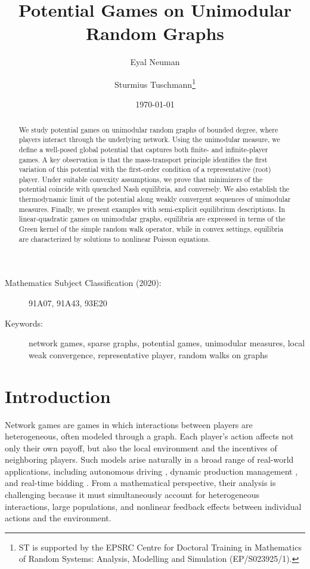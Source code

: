 \documentclass[11pt]{article}
\numberwithin{equation}{section}
\begin{document}
\title{Potential Games on Unimodular Random Graphs}
\author[]{Eyal Neuman}
\author[]{Sturmius Tuschmann\thanks{ST is supported by the EPSRC Centre for Doctoral Training in Mathematics of Random Systems: Analysis, Modelling and Simulation (EP/S023925/1).}}
\renewcommand\Authands{ and }
\date{\today}
\maketitle

\begin{abstract}
We study potential games on unimodular random graphs of bounded degree, where players interact through the underlying network. Using the unimodular measure, we define a well-posed global potential that captures both finite- and infinite-player games. A key observation is that the mass-transport principle identifies the first variation of this potential with the first-order condition of a representative (root) player. Under suitable convexity assumptions, we prove that minimizers of the potential coincide with quenched Nash equilibria, and conversely. We also establish the thermodynamic limit of the potential along weakly convergent sequences of unimodular measures. Finally, we present examples with semi-explicit equilibrium descriptions. In linear-quadratic games on unimodular graphs, equilibria are expressed in terms of the Green kernel of the simple random walk operator, while in convex settings, equilibria are characterized by solutions to nonlinear Poisson equations.
\end{abstract}


\begin{description}
\item[Mathematics Subject Classification (2020):] 	91A07, 91A43, 93E20 
\item[Keywords:] network games, sparse graphs, potential games, unimodular measures, local weak convergence, representative player, random walks on graphs
\end{description}

\section{Introduction}

Network games are games in which interactions between players are heterogeneous, often modeled through a graph. Each player’s action affects not only their own payoff, but also the local environment and the incentives of neighboring players. Such models arise naturally in a broad range of real-world applications, including autonomous driving \cite{hang2020human}, dynamic production management \cite{leng2005game}, and real-time bidding \cite{sayedi2018real}. From a mathematical perspective, their analysis is challenging because it must simultaneously account for heterogeneous interactions, large populations, and nonlinear feedback effects between individual actions and the environment.
\end{document}
